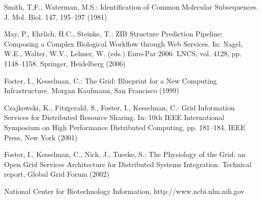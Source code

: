 \documentclass[lnicst,sechang,a4paper]{svmultln}
\begin{document}
\begin{thebibliography}{4}

 Smith, T.F., Waterman, M.S.: Identification of Common Molecular
Subsequences. J. Mol. Biol. 147, 195--197 (1981)

 May, P., Ehrlich, H.C., Steinke, T.: ZIB Structure Prediction Pipeline:
Composing a Complex Biological Workflow through Web Services. In: Nagel,
W.E., Walter, W.V., Lehner, W. (eds.) Euro-Par 2006. LNCS, vol. 4128,
pp. 1148--1158. Springer, Heidelberg (2006)

 Foster, I., Kesselman, C.: The Grid: Blueprint for a New Computing
Infrastructure. Morgan Kaufmann, San Francisco (1999)

 Czajkowski, K., Fitzgerald, S., Foster, I., Kesselman, C.: Grid
Information Services for Distributed Resource Sharing. In: 10th IEEE
International Symposium on High Performance Distributed Computing, pp.
181--184. IEEE Press, New York (2001)

 Foster, I., Kesselman, C., Nick, J., Tuecke, S.: The Physiology of the
Grid: an Open Grid Services Architecture for Distributed Systems
Integration. Technical report, Global Grid Forum (2002)

 National Center for Biotechnology Information, http://www.ncbi.nlm.nih.gov

\end{thebibliography}
\end{document}
